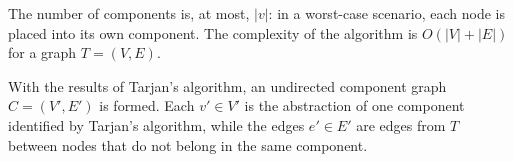 \documentclass[conference]{IEEEtran}
\begin{document}



%


The number of components is, at most, $|v|$: in a worst-case scenario, each node is placed into its own component.
The complexity of the algorithm is $O(|V|+|E|)$ for a graph $T = (V,E)$.


With the results of Tarjan's algorithm, an undirected component graph $C = (V',E')$ is formed.
Each $v' \in V'$ is the abstraction of one component identified by Tarjan's algorithm, while the edges $e' \in E'$ are edges from $T$ between nodes that do not belong in the same component.
\end{document}
